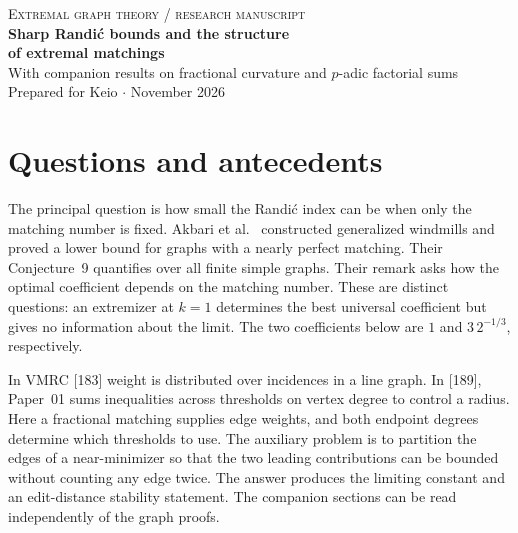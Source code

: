 \documentclass[11pt]{article}
\theoremstyle{remark}\newtheorem{remark}[theorem]{Remark}
\begin{document}
\begin{center}
{\small\color{ink}\textsc{Extremal graph theory \enspace / \enspace research manuscript}}\\[10pt]
{\LARGE\bfseries Sharp Randi\'c bounds and the structure\\[3pt] of extremal matchings}\\[9pt]
{\normalsize With companion results on fractional curvature and $p$-adic factorial sums}\\[8pt]
{\small Prepared for Keio \enspace$\cdot$ November 2026}
\end{center}
\begin{abstract}
For every finite simple graph $G$, its Randi\'c index is at least the two-thirds power of its fractional matching number. The constant one is sharp. For ordinary matching number $k$ tending to infinity the infimum of $R(G)/k^{2/3}$ tends to $3\,2^{-1/3}$. This proves Conjecture~9 of Akbari et al.\ and determines the limiting coefficient asked for in their subsequent remark. An averaging argument selects complementary degree ranges and separates the weight of matched edges from that of the cut. Near equality forces a complete bipartite graph with part sizes asymptotic to $2k$ and $(2k)^{1/3}$ up to $o(k^{4/3})$ edge edits. Two independent applications of corpus-inspired estimates give exact finite curvature interpolation under strictly decreasing polynomial forcing, and the full root count for John C's alternating factorial Mahler series, including an exact dyadic valuation formula.
\end{abstract}
\tableofcontents
\section*{Questions and antecedents}
The principal question is how small the Randi\'c index can be when only the matching number is fixed. Akbari et al.\ \cite{AGGHT} constructed generalized windmills and proved a lower bound for graphs with a nearly perfect matching. Their Conjecture~9 quantifies over all finite simple graphs. Their remark asks how the optimal coefficient depends on the matching number. These are distinct questions: an extremizer at $k=1$ determines the best universal coefficient but gives no information about the limit. The two coefficients below are $1$ and $3\,2^{-1/3}$, respectively.
\par
In VMRC [183] weight is distributed over incidences in a line graph. In [189], Paper~01 sums inequalities across thresholds on vertex degree to control a radius. Here a fractional matching supplies edge weights, and both endpoint degrees determine which thresholds to use. The auxiliary problem is to partition the edges of a near-minimizer so that the two leading contributions can be bounded without counting any edge twice. The answer produces the limiting constant and an edit-distance stability statement. The companion sections can be read independently of the graph proofs.
\clearpage
\end{document}
